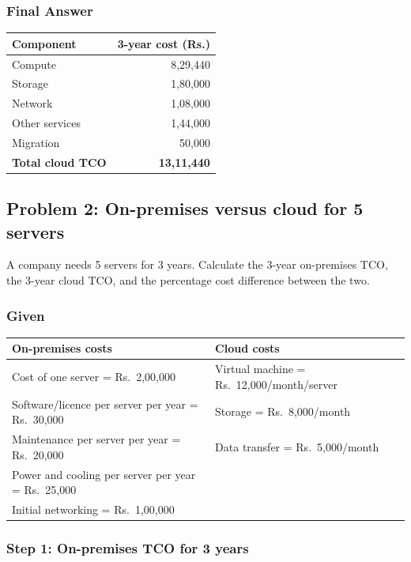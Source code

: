 \documentclass[11pt,a4paper]{article}
\begin{document}
\subsubsection*{Final Answer}

\begin{tabularx}{\textwidth}{@{}Xr@{}}
\toprule
\rowcolor{tablehead}\textbf{Component} & \textbf{3-year cost (Rs.)} \\
\midrule
Compute & 8,29,440 \\
Storage & 1,80,000 \\
Network & 1,08,000 \\
Other services & 1,44,000 \\
Migration & 50,000 \\
\midrule
\textbf{Total cloud TCO} & \textbf{13,11,440} \\
\bottomrule
\end{tabularx}

\subsection*{Problem 2: On-premises versus cloud for 5 servers}

A company needs 5 servers for 3 years. Calculate the 3-year on-premises TCO, the 3-year
cloud TCO, and the percentage cost difference between the two.

\subsubsection*{Given}

\begin{tabularx}{\textwidth}{@{}XX@{}}
\toprule
\rowcolor{tablehead}\textbf{On-premises costs} & \textbf{Cloud costs} \\
\midrule
Cost of one server = Rs.\ 2,00,000 & Virtual machine = Rs.\ 12,000/month/server \\
Software/licence per server per year = Rs.\ 30,000 & Storage = Rs.\ 8,000/month \\
Maintenance per server per year = Rs.\ 20,000 & Data transfer = Rs.\ 5,000/month \\
Power and cooling per server per year = Rs.\ 25,000 & \\
Initial networking = Rs.\ 1,00,000 & \\
\bottomrule
\end{tabularx}

\subsubsection*{Step 1: On-premises TCO for 3 years}
\end{document}
